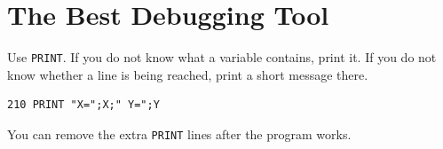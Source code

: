 \section*{The Best Debugging Tool}
{}

Use \texttt{PRINT}. If you do not know what a variable contains, print it. If
you do not know whether a line is being reached, print a short message there.

\begin{lstlisting}
210 PRINT "X=";X;" Y=";Y
\end{lstlisting}

You can remove the extra \texttt{PRINT} lines after the program works.
